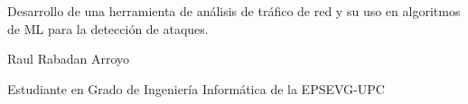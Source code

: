 \documentclass[10pt,a4paper,twoside]{article}
\begin{document}
\begin{center}
    \bfseries\fontsize{22pt}{27pt}\selectfont\par
    Desarrollo de una herramienta de análisis de tráfico de red y su uso en algoritmos de ML para la detección de ataques.
    \par
\end{center}

\bigskip

\begin{center}
    \large\par
    Raul Rabadan Arroyo
    \par
\end{center}

\begin{center}
    \par
    Estudiante en Grado de Ingeniería Informática de la EPSEVG-UPC
    \par
\end{center}

\smallskip
\end{document}
